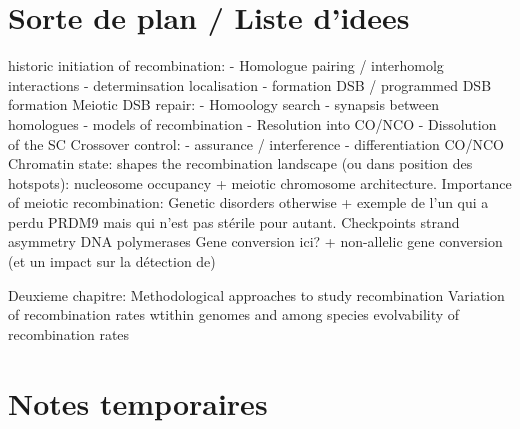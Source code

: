 \section*{Sorte de plan / Liste d'idees}
historic
initiation of recombination: 
- Homologue pairing / interhomolg interactions
- determinsation localisation
- formation DSB / programmed DSB formation
Meiotic DSB repair:
- Homoology search
- synapsis between homologues
- models of recombination
- Resolution into CO/NCO
- Dissolution of the SC
Crossover control: 
- assurance / interference
- differentiation CO/NCO
Chromatin state: shapes the recombination landscape (ou dans position des hotspots): nucleosome occupancy + meiotic chromosome architecture. 
Importance of meiotic recombination: Genetic disorders otherwise + exemple de l'un qui a perdu PRDM9 mais qui n'est pas stérile pour autant. 
Checkpoints
strand asymmetry
DNA polymerases
Gene conversion ici? + non-allelic gene conversion (et un impact sur la détection de)



Deuxieme chapitre:
Methodological approaches to study recombination
Variation of recombination rates wtithin genomes and among species
evolvability of recombination rates



\section*{Notes temporaires}


%




